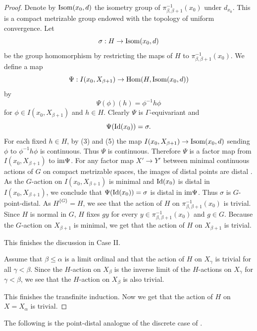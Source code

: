 \documentclass[11pt]{amsart}
\theoremstyle{definition}
\numberwithin{equation}{section}
\theoremstyle{definition}
\newcommand{\im}{{\rm im}}
\newcommand{\Hom}{{\rm Hom}}
\begin{document}
\begin{proof}
Denote by ${\rm Isom}(x_0, d)$ the isometry group of $\pi_{\beta, \beta+1}^{-1}(x_0)$ under $d_{x_0}$. This is a compact metrizable group endowed with the topology of uniform convergence. Let
$$\sigma: H\rightarrow {\rm Isom}(x_0, d)$$
be the group homomorphism by restricting the maps of $H$ to $\pi_{\beta, \beta+1}^{-1}(x_0)$. We define a map 
$$\Psi: I(x_0, X_{\beta+1})\rightarrow \Hom(H, {\rm Isom}(x_0, d))$$
by
$$ \Psi(\phi)(h)=\phi^{-1}h\phi$$
for $\phi\in I(x_0, X_{\beta+1})$ and $h\in H$. Clearly $\Psi$ is $\Gamma$-equivariant and 
$$\Psi({\rm Id}(x_0))=\sigma.$$
For each fixed $h\in H$, by (3) and (5) the map $I(x_0, X_{\beta+1})\rightarrow {\rm Isom}(x_0, d)$ sending $\phi$ to $\phi^{-1}h\phi$ is continuous. Thus $\Psi$ is continuous. Therefore $\Psi$ is a factor map from $I(x_0, X_{\beta+1})$ to $\im \Psi$. 
For any factor map $X'\rightarrow Y'$ between minimal continuous actions of $G$ on compact metrizable spaces, the images of distal points are distal \cite[Corollary IV.3.25.2]{deVries}. As the $G$-action on $I(x_0, X_{\beta+1})$ is minimal and ${\rm Id}(x_0)$ is distal in $I(x_0, X_{\beta+1})$, we conclude that $\Psi({\rm Id}(x_0))=\sigma$ is distal in $\im \Psi$. Thus $\sigma$ is $G$-point-distal.
As $H^{\{G\}}=H$, we see that the action of $H$ on $\pi_{\beta, \beta+1}^{-1}(x_0)$ is trivial. 
Since $H$ is normal in $G$, $H$ fixes $gy$ for every $y\in \pi_{\beta, \beta+1}^{-1}(x_0)$ and $g\in G$. 
Because the $G$-action on $X_{\beta+1}$ is minimal, we get that the action of $H$ on $X_{\beta+1}$ is trivial. 

This finishes the discussion in Case II. 

Assume that $\beta\le \alpha$ is a limit ordinal and that the action of $H$ on $X_\gamma$ is trivial for all $\gamma<\beta$. Since the $H$-action on $X_\beta$ is the inverse limit of the $H$-actions on $X_\gamma$ for $\gamma<\beta$, we see that the $H$-action on $X_\beta$ is also trivial.

This finishes the transfinite induction. Now we get that the action of $H$ on $X=X_\alpha$ is trivial.
 \end{proof}

The following is the point-distal analogue of the discrete case of \cite[Theorem 2.5]{Abels83}. 
\end{document}

